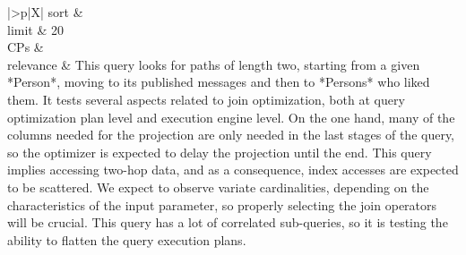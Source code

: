 \begin{tabularx}{\queryCardWidth}{|>{\queryPropertyCell}p{\queryPropertyCellWidth}|X|}
		sort		&
		\innerCardVSpace \\ \hline
	limit & 20 \\ \hline
	CPs &
	 \\ \hline
	relevance &
		\footnotesize This query looks for paths of length two, starting from a given *Person*, moving to its published messages and then to *Persons* who liked them. It tests several aspects related to join optimization, both at query optimization plan level and execution engine level. On the one hand, many of the columns needed for the projection are only needed in the last stages of the query, so the optimizer is expected to delay the projection until the end. This query implies accessing two-hop data, and as a consequence, index accesses are expected to be scattered. We expect to observe variate cardinalities, depending on the characteristics of the input parameter, so properly selecting the join operators will be crucial. This query has a lot of correlated sub-queries, so it is testing the ability to flatten the query execution plans.
 \\ \hline%
\end{tabularx}
\queryCardVSpace

\let\emph\oldemph
